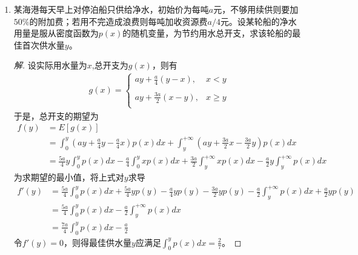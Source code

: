 \documentclass[12pt]{article}
\newcommand{\hei}{\CJKfamily{hei}}                          %
\begin{document}
\begin{enumerate}
\item{\hei 某海港每天早上对停泊船只供给净水，初始价为每吨$a$元，不够用续供则要加$50\%$的附加费；若用不完造成浪费则每吨加收资源费$a/4$元。设某轮船的净水用量是服从密度函数为$p\left( x \right)$的随机变量，为节约用水总开支，求该轮船的最佳首次供水量$y$。}
\begin{proof}[解]
	设实际用水量为$x$,总开支为$g\left( x \right)$，则有
	\begin{equation}
		\begin{aligned}
			g\left( x \right)=\left\{ \begin{matrix}
			ay+\displaystyle{\frac{a}{4}}\left( y-x \right),&x<y  \\
			\\
			ay+\displaystyle{\frac{3a}{2}}\left( x-y \right),&x\ge y  \\
			\end{matrix} \right.
		\end{aligned}
	\end{equation}
	于是，总开支的期望为
	\begin{equation}
		\begin{aligned}
		f\left( y \right)&=E\left[ g\left( x \right) \right] \\ 
		& =\int_{0}^{y}{\left( ay+\frac{a}{4}y-\frac{a}{4}x \right)p\left( x \right)dx}+\int_{y}^{+\infty }{\left( ay+\frac{3a}{2}x-\frac{3a}{2}y \right)p\left( x \right)dx} \\ 
		& =\frac{5a}{4}y\int_{0}^{y}{p\left( x \right)dx}-\frac{a}{4}\int_{0}^{y}{xp\left( x \right)dx}+\frac{3a}{2}\int_{y}^{+\infty }{xp\left( x \right)dx}-\frac{a}{2}y\int_{y}^{+\infty }{p\left( x \right)dx}  
		\end{aligned}
	\end{equation}
	为求期望的最小值，将上式对$y$求导
	\begin{equation}
		\begin{aligned}
		 {f}'\left( y \right)&=\frac{5a}{4}\int_{0}^{y}{p\left( x \right)dx}+\frac{5a}{4}yp\left( y \right)-\frac{a}{4}yp\left( y \right)-\frac{3a}{2}yp\left( y \right)-\frac{a}{2}\int_{y}^{+\infty }{p\left( x \right)dx}+\frac{a}{2}yp\left( y \right) \\ 
		& =\frac{5a}{4}\int_{0}^{y}{p\left( x \right)dx}-\frac{a}{2}\int_{y}^{+\infty }{p\left( x \right)dx} \\ 
		& =\frac{7a}{4}\int_{0}^{y}{p\left( x \right)dx}-\frac{a}{2}  
		\end{aligned}
	\end{equation}
	令$ {f}'\left( y \right)=0 $，则得最佳供水量$ y $应满足$\displaystyle{ \int_{0}^{y}{p\left( x \right)dx}= \frac{2}{7}}$。
\end{proof}


\end{enumerate}
\end{document}
